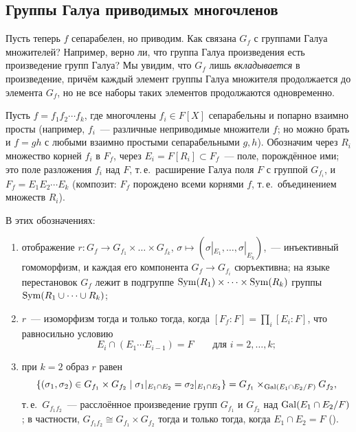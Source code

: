 \subsection*{Группы Галуа приводимых многочленов}

Пусть теперь $f$ сепарабелен, но приводим. Как связана $G_f$ с группами Галуа множителей? Например, верно ли, что
группа Галуа произведения есть произведение групп Галуа? Мы увидим, что $G_f$ лишь \emph{вкладывается} в произведение,
причём каждый элемент группы Галуа множителя продолжается до элемента $G_f$, но не все наборы таких элементов
продолжаются одновременно.

Пусть $f=f_1f_2\cdots f_k$, где многочлены $f_i\in F[X]$ сепарабельны и попарно взаимно просты (например, $f_i$~---
различные неприводимые множители $f$; но можно брать и $f=gh$ с любыми взаимно простыми сепарабельными $g,h$).
Обозначим через $R_i$ множество корней $f_i$ в $F_f$, через $E_i=F[R_i]\subset F_f$~--- поле, порождённое ими; это поле
разложения $f_i$ над $F$, т.\,е.\ расширение Галуа поля $F$ с группой $G_{f_i}$, и $F_f=E_1E_2\cdots E_k$ (композит:
$F_f$ порождено всеми корнями $f$, т.\,е.\ объединением множеств $R_i$).

\begin{proposition}[3.27e]
В этих обозначениях:
\begin{enumerate}[label=\textup{(\alph*)}]
\item отображение $r\colon G_f\to G_{f_1}\times\dots\times G_{f_k}$, $\sigma\mapsto(\sigma|_{E_1},\dots,\sigma|_{E_k})$,~---
инъективный гомоморфизм, и каждая его компонента $G_f\to G_{f_i}$ сюръективна; на языке перестановок $G_f$ лежит в
подгруппе $\operatorname{Sym}(R_1)\times\dots\times\operatorname{Sym}(R_k)$ группы $\operatorname{Sym}(R_1\cup\dots\cup R_k)$;
\item $r$~--- изоморфизм тогда и только тогда, когда $[F_f:F]=\prod_i[E_i:F]$, что равносильно условию
\[
E_i\cap(E_1\cdots E_{i-1})=F\qquad\text{для }i=2,\dots,k;
\]
\item при $k=2$ образ $r$ равен
\[
\{(\sigma_1,\sigma_2)\in G_{f_1}\times G_{f_2}\mid \sigma_1|_{E_1\cap E_2}=\sigma_2|_{E_1\cap E_2}\}
=G_{f_1}\times_{\operatorname{Gal}(E_1\cap E_2/F)}G_{f_2},
\]
т.\,е.\ $G_{f_1f_2}$~--- расслоённое произведение групп $G_{f_1}$ и $G_{f_2}$ над $\operatorname{Gal}(E_1\cap E_2/F)$; в частности,
$G_{f_1f_2}\cong G_{f_1}\times G_{f_2}$ тогда и только тогда, когда $E_1\cap E_2=F$ \textup(\textup).
\end{enumerate}
\end{proposition}

